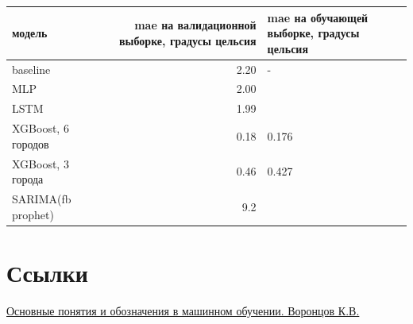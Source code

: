\documentclass[11pt]{article}
\begin{document}
\begin{center}
\begin{tabular}{lrl}
модель & mae на валидационной выборке, градусы цельсия & mae на обучающей выборке, градусы цельсия\\
\hline
baseline & 2.20 & -\\
MLP & 2.00 & \\
LSTM & 1.99 & \\
XGBoost, 6 городов & 0.18 & 0.176\\
XGBoost, 3 города & 0.46 & 0.427\\
SARIMA(fb prophet) & 9.2 & \\
\hline
\end{tabular}
\end{center}

\section{Ссылки}
\label{sec:orgc1a8b19}
\href{http://www.machinelearning.ru/wiki/images/archive/f/fc/20130211221536\%21Voron-ML-Intro-slides.pdf}{Основные понятия и обозначения в машинном обучении. Воронцов К.В.}
\end{document}
